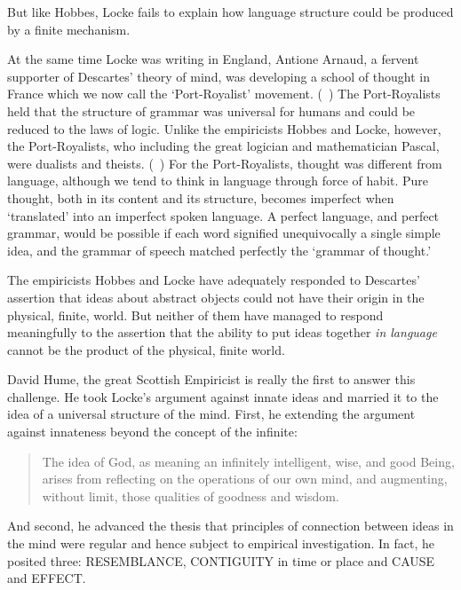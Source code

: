 \begin{refsection}
But like Hobbes, Locke fails to explain how language structure could be produced by a finite mechanism.

At the same time Locke was writing in England, Antione Arnaud, a fervent supporter of Descartes' theory of mind, was developing a school of thought in France which we now call the `Port-Royalist' movement. (~\citep{Carr:1996uw}) The Port-Royalists held that the structure of grammar was universal for humans and could be reduced to the laws of logic. Unlike the empiricists Hobbes and Locke, however, the Port-Royalists, who including the great logician and mathematician Pascal, were dualists and theists. (~\citep{Clark1903}) For the Port-Royalists, thought was different from language, although we tend to think in language through force of habit. Pure thought, both in its content and its structure, becomes imperfect when `translated' into an imperfect spoken language. A perfect language, and perfect grammar, would be possible if each word signified unequivocally a single simple idea, and the grammar of speech matched perfectly the `grammar of thought.' 

The empiricists Hobbes and Locke have adequately responded to Descartes' assertion that ideas about abstract objects could not have their origin in the physical, finite, world. But neither of them have managed to respond meaningfully to the assertion that the ability to put ideas together \emph{in language} cannot be the product of the physical, finite world.

David Hume, the great Scottish Empiricist is really the first to answer this challenge. He took Locke's argument against innate ideas and married it to the idea of a universal structure of the mind. First, he extending the argument against innateness beyond the concept of the infinite:

\begin{quote}

The idea of God, as meaning an infinitely intelligent, wise, and good Being, arises from reflecting on the operations of our own mind, and augmenting, without limit, those qualities of goodness and wisdom. ~\citep[\S 2, p. 14]{Hume:IGMvPNU2}
\end{quote}

And second, he advanced the thesis that principles of connection between ideas in the mind were regular and hence subject to empirical investigation. In fact, he posited three: RESEMBLANCE, CONTIGUITY in time or place and CAUSE and EFFECT. ~\citep[Part 1, \S  IV]{Hume:IGMvPNU2}


\end{refsection}
